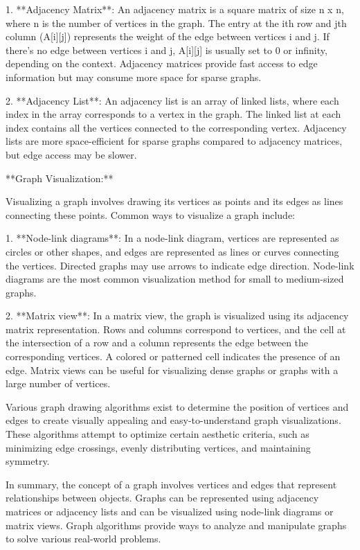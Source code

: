 \documentclass{article}
\begin{document}
1. **Adjacency Matrix**: An adjacency matrix is a square matrix of size n x n, where n is the number of vertices in the graph. The entry at the ith row and jth column (A[i][j]) represents the weight of the edge between vertices i and j. If there's no edge between vertices i and j, A[i][j] is usually set to 0 or infinity, depending on the context. Adjacency matrices provide fast access to edge information but may consume more space for sparse graphs.

2. **Adjacency List**: An adjacency list is an array of linked lists, where each index in the array corresponds to a vertex in the graph. The linked list at each index contains all the vertices connected to the corresponding vertex. Adjacency lists are more space-efficient for sparse graphs compared to adjacency matrices, but edge access may be slower.

**Graph Visualization:**

Visualizing a graph involves drawing its vertices as points and its edges as lines connecting these points. Common ways to visualize a graph include:

1. **Node-link diagrams**: In a node-link diagram, vertices are represented as circles or other shapes, and edges are represented as lines or curves connecting the vertices. Directed graphs may use arrows to indicate edge direction. Node-link diagrams are the most common visualization method for small to medium-sized graphs.

2. **Matrix view**: In a matrix view, the graph is visualized using its adjacency matrix representation. Rows and columns correspond to vertices, and the cell at the intersection of a row and a column represents the edge between the corresponding vertices. A colored or patterned cell indicates the presence of an edge. Matrix views can be useful for visualizing dense graphs or graphs with a large number of vertices.

Various graph drawing algorithms exist to determine the position of vertices and edges to create visually appealing and easy-to-understand graph visualizations. These algorithms attempt to optimize certain aesthetic criteria, such as minimizing edge crossings, evenly distributing vertices, and maintaining symmetry.

In summary, the concept of a graph involves vertices and edges that represent relationships between objects. Graphs can be represented using adjacency matrices or adjacency lists and can be visualized using node-link diagrams or matrix views. Graph algorithms provide ways to analyze and manipulate graphs to solve various real-world problems.
\end{document}
